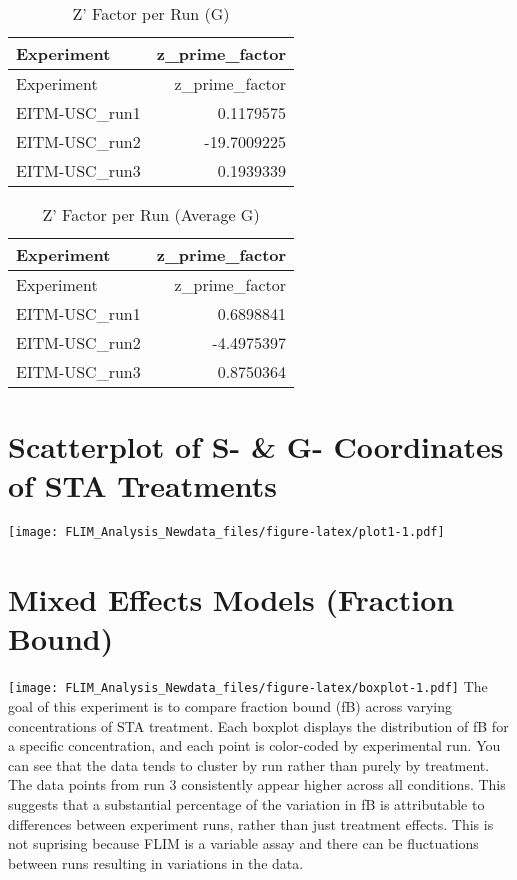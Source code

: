 \documentclass[
]{article}
\begin{document}
\begin{longtable}[]{@{}lr@{}}
\caption{Z' Factor per Run (G)}\tabularnewline
\toprule\noalign{}
Experiment & z\_prime\_factor \\
\midrule\noalign{}
\endfirsthead
\toprule\noalign{}
Experiment & z\_prime\_factor \\
\midrule\noalign{}
\endhead
\bottomrule\noalign{}
\endlastfoot
EITM-USC\_run1 & 0.1179575 \\
EITM-USC\_run2 & -19.7009225 \\
EITM-USC\_run3 & 0.1939339 \\
\end{longtable}

\begin{longtable}[]{@{}lr@{}}
\caption{Z' Factor per Run (Average G)}\tabularnewline
\toprule\noalign{}
Experiment & z\_prime\_factor \\
\midrule\noalign{}
\endfirsthead
\toprule\noalign{}
Experiment & z\_prime\_factor \\
\midrule\noalign{}
\endhead
\bottomrule\noalign{}
\endlastfoot
EITM-USC\_run1 & 0.6898841 \\
EITM-USC\_run2 & -4.4975397 \\
EITM-USC\_run3 & 0.8750364 \\
\end{longtable}

\section{Scatterplot of S- \& G- Coordinates of STA
Treatments}\label{scatterplot-of-s--g--coordinates-of-sta-treatments}

\texttt{[image: FLIM\_Analysis\_Newdata\_files/figure-latex/plot1-1.pdf]}

\section{Mixed Effects Models (Fraction
Bound)}\label{mixed-effects-models-fraction-bound}

\texttt{[image: FLIM\_Analysis\_Newdata\_files/figure-latex/boxplot-1.pdf]}
The goal of this experiment is to compare fraction bound (fB) across
varying concentrations of STA treatment. Each boxplot displays the
distribution of fB for a specific concentration, and each point is
color-coded by experimental run. You can see that the data tends to
cluster by run rather than purely by treatment. The data points from run
3 consistently appear higher across all conditions. This suggests that a
substantial percentage of the variation in fB is attributable to
differences between experiment runs, rather than just treatment effects.
This is not suprising because FLIM is a variable assay and there can be
fluctuations between runs resulting in variations in the data.
\end{document}
